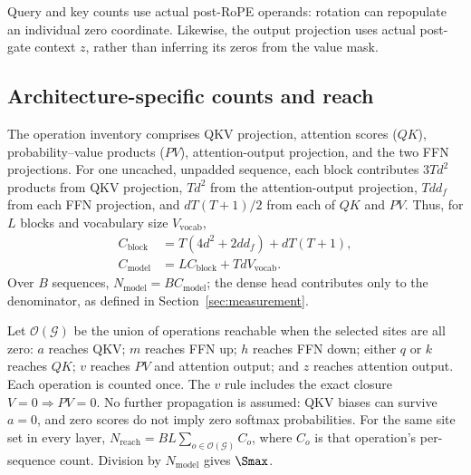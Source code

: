 Query and key counts use actual
post-RoPE operands: rotation can repopulate an individual zero coordinate.
Likewise, the output projection uses actual post-gate context $z$, rather than
inferring its zeros from the value mask. 
\subsection{Architecture-specific counts and reach}
\label{app:architecture-counts}

The operation inventory comprises QKV projection, attention scores ($QK$),
probability--value products ($PV$), attention-output projection, and the two
FFN projections. For one uncached, unpadded sequence, each block contributes $3Td^2$ products
from QKV projection, $Td^2$ from the attention-output projection, $Td d_f$ from
each FFN projection, and $dT(T+1)/2$ from each of $QK$ and $PV$.
Thus, for $L$ blocks and vocabulary size $V_{\!\mathrm{vocab}}$,
\begin{equation}
\begin{split}
C_{\mathrm{block}}&=T(4d^2+2dd_f)+dT(T+1),\\
C_{\mathrm{model}}&=LC_{\mathrm{block}}+TdV_{\!\mathrm{vocab}}.
\end{split}
\label{eq:denominator}
\end{equation}
Over $B$ sequences, $N_{\mathrm{model}}=BC_{\mathrm{model}}$; the dense head
contributes only to the denominator, as defined in Section~\ref{sec:measurement}.

Let $\mathcal{O}(\mathcal{G})$ be the union of operations reachable when the
selected sites are all zero: $a$ reaches QKV; $m$ reaches FFN up; $h$ reaches
FFN down; either $q$ or $k$ reaches $QK$; $v$ reaches $PV$ and attention output;
and $z$ reaches attention output. Each operation is counted once.
The $v$ rule includes the exact closure $V=0\Rightarrow PV=0$. No further
propagation is assumed: QKV biases can survive $a=0$, and zero scores do not
imply zero softmax probabilities. For the same site set in every layer,
$N_{\mathrm{reach}}=BL\sum_{o\in\mathcal{O}(\mathcal{G})}C_o$, where $C_o$
is that operation's per-sequence count. Division by $N_{\mathrm{model}}$ gives
$\Smax$.

